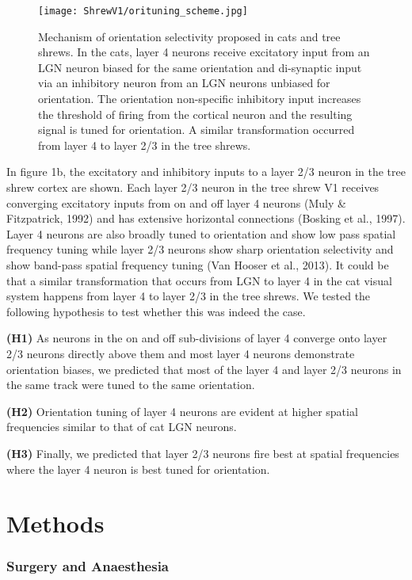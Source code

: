 \begin{figure}[H]
	\centering
	\texttt{[image: ShrewV1/orituning\_scheme.jpg]}
	
	\caption{Mechanism of orientation selectivity proposed in cats and tree
		shrews. In the cats, layer 4 neurons receive excitatory input from an
		LGN neuron biased for the same orientation and di-synaptic input via an
		inhibitory neuron from an LGN neurons unbiased for orientation. The
		orientation non-specific inhibitory input increases the threshold of
		firing from the cortical neuron and the resulting signal is tuned for
		orientation. A similar transformation occurred from layer 4 to layer 2/3
		in the tree shrews.}
	\label{fig:orischeme}
\end{figure}



In figure 1b, the excitatory and inhibitory inputs to a layer 2/3 neuron
in the tree shrew cortex are shown. Each layer 2/3 neuron in the tree
shrew V1 receives converging excitatory inputs from on and off layer 4
neurons (Muly \& Fitzpatrick, 1992) and has extensive horizontal
connections (Bosking et al., 1997). Layer 4 neurons are also broadly
tuned to orientation and show low pass spatial frequency tuning while
layer 2/3 neurons show sharp orientation selectivity and show band-pass
spatial frequency tuning (Van Hooser et al., 2013). It could be that a
similar transformation that occurs from LGN to layer 4 in the cat visual
system happens from layer 4 to layer 2/3 in the tree shrews. We tested
the following hypothesis to test whether this was indeed the case.

\textbf{(H1)} As neurons in the on and off sub-divisions of layer 4
converge onto layer 2/3 neurons directly above them and most layer 4
neurons demonstrate orientation biases, we predicted that most of the
layer 4 and layer 2/3 neurons in the same track were tuned to the same
orientation.

\textbf{(H2)} Orientation tuning of layer 4 neurons are evident at
higher spatial frequencies similar to that of cat LGN neurons.

\textbf{(H3)} Finally, we predicted that layer 2/3 neurons fire best at
spatial frequencies where the layer 4 neuron is best tuned for
orientation.


\section{Methods}


\subsubsection{Surgery and Anaesthesia}

